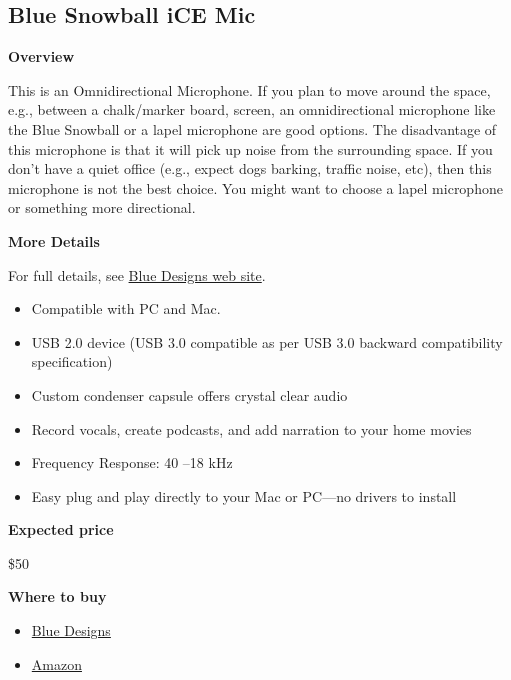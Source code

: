 \subsection{Blue Snowball iCE Mic}
\label{sec:equipment::bluesnow}

\begin{gram}
\label{grm:equipment::bluesnow::overview}

\textbf{Overview}

This is an Omnidirectional Microphone. If you plan to move around the
space, e.g., between a chalk/marker board, screen, an omnidirectional
microphone like the Blue Snowball or a lapel microphone are good
options.
%
The disadvantage of this microphone is that it will pick up noise from the surrounding space.
%
If you don't have a quiet office (e.g., expect dogs barking, traffic noise, etc), then this microphone is not the best choice.  
%
You might want to choose a lapel microphone or something more directional.




\textbf{More Details}

For full details, see \href{https://www.bluedesigns.com/products/snowball-ice/}{Blue Designs web site}.

\begin{itemize}
\item
Compatible with PC and Mac.

\item  USB 2.0 device (USB 3.0 compatible as per USB 3.0 backward compatibility specification)

\item Custom condenser capsule offers crystal clear audio

\item Record vocals, create podcasts, and add narration to your home movies

\item Frequency Response: 40 –18 kHz

\item Easy plug and play directly to your Mac or PC—no drivers to install
\end{itemize}



\textbf{Expected price}

\$50


\textbf{Where to buy}


\begin{itemize}
\item 
\href{https://www.bluedesigns.com/products/snowball-ice/}{Blue Designs}

\item 
\href{https://www.amazon.com/Blue-Snowball-Condenser-Microphone-Cardioid/dp/B006DIA77E/ref=sxin_2_ac_d_rm?ac_md=1-1-c25vd2JhbGwgbWljcm9waG9uZQ%3D%3D-ac_d_rm&crid=35T8W1KNGCU61&cv_ct_cx=blue+yeti+usb+microphone&keywords=blue+yeti+usb+microphone&pd_rd_i=B006DIA77E&pd_rd_r=3aa58f9d-30b3-4a94-a0f9-899d4ec51554&pd_rd_w=TANss&pd_rd_wg=OOiJB&pf_rd_p=ec111f65-4a46-499c-be78-f47997212bd0&pf_rd_r=BKY12JJMDCSM54ABWTDX&psc=1&qid=1582900292&sprefix=Blue+ye,aps,168}{Amazon}
\end{itemize}

\end{gram}

